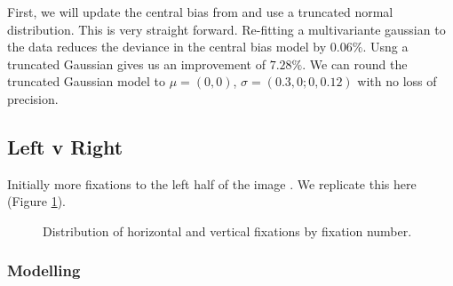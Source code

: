 \documentclass[a4paper, onecolumn, oneside, 11pt]{article}
\begin{document}
First, we will update the central bias from \cite{clarke-tatler2014} and use a truncated normal distribution. This is very straight forward. Re-fitting a multivariante gaussian to the data reduces the deviance in the central bias model by $0.06\%$. Usng a truncated Gaussian gives us an improvement of $7.28\%$. We can round the truncated Gaussian model to $\mu = (0,0)$, $\sigma=(0.3, 0; 0, 0.12)$ with no loss of precision. 

\subsection{Left v Right}

Initially more fixations to the left half of the image \citep{nuthmann-matthias2014}. We replicate this here (Figure \ref{fig:leftrightDist}).

\begin{figure}
\centering
{}
\caption{Distribution of horizontal and vertical fixations by fixation number.}
\label{fig:leftrightDist}
\end{figure}

\subsubsection{Modelling}
\end{document}
